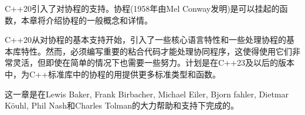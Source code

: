 C++20引入了对协程的支持。协程(1958年由Mel Conway发明)是可以挂起的函数，本章将介绍协程的一般概念和详情。

C++20从对协程的基本支持开始，引入了一些核心语言特性和一些处理协程的基本库特性。然而，必须编写重要的粘合代码才能处理协同程序，这使得使用它们非常灵活，但即使在简单的情况下也需要一些努力。计划是在C++23及以后的版本中，为C++标准库中的协程的用提供更多标准类型和函数。

这一章是在Lewis Baker, Frank Birbacher, Michael Eiler, Bjorn fahler, Dietmar K{\"o}uhl, Phil Nash和Charles Tolman的大力帮助和支持下完成的。
